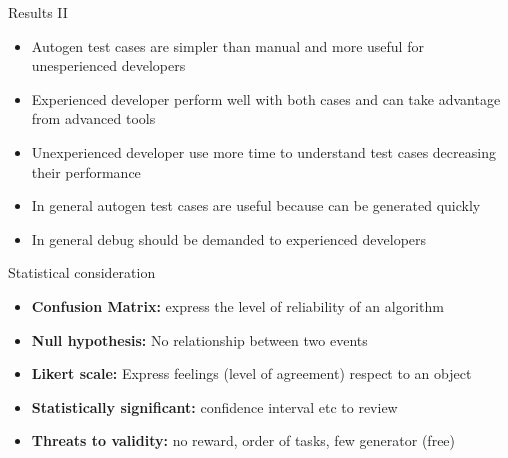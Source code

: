 \documentclass{beamer}
\newcommand{\itembf}[1]{\item \textbf{#1}}
\begin{document}
\begin{frame}{Results II}
	\begin{itemize} 
		\item Autogen test cases are simpler than manual and more useful for unesperienced developers
		\item Experienced developer perform well with both cases and can take advantage from advanced tools
		\item Unexperienced developer use more time to understand test cases decreasing their performance 
		\item In general autogen test cases are useful because can be generated quickly
		\item In general debug should be demanded to experienced developers
	\end{itemize}
\end{frame}

\begin{frame}{Statistical consideration}
	\begin{itemize} 
		\itembf{Confusion Matrix:} express the level of reliability of an algorithm 
		\itembf{Null hypothesis:} No relationship between two events
		\itembf{Likert scale:} Express feelings (level of agreement) respect to an object
		\itembf{Statistically significant: } confidence interval etc to review
		\itembf{Threats to validity:} no reward, order of tasks, few generator (free)
	\end{itemize}
\end{frame}
\end{document}
